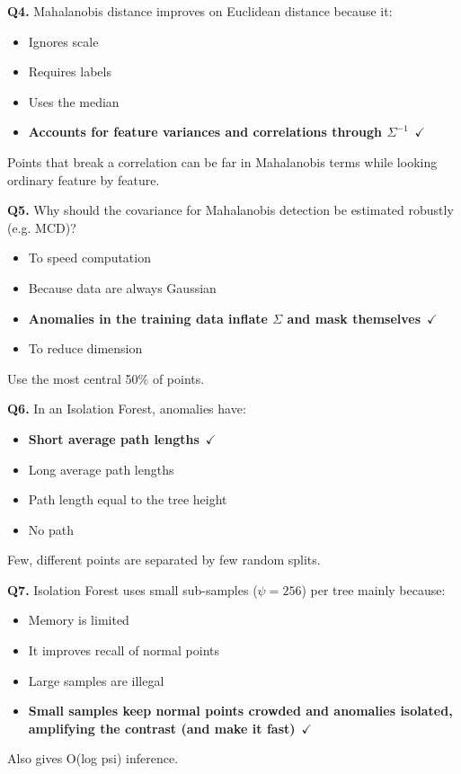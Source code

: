 \documentclass[11pt]{article}
\begin{document}
{\noindent\textbf{Q4.} Mahalanobis distance improves on Euclidean distance because it:\begin{itemize}[leftmargin=2.2em,itemsep=0pt,topsep=1pt]\item[A.] Ignores scale\item[B.] Requires labels\item[C.] Uses the median\item[\textbf{D.}] \textbf{Accounts for feature variances and correlations through $\Sigma^{-1}$}~{\color{GrnN}$\checkmark$}\end{itemize} Points that break a correlation can be far in Mahalanobis terms while looking ordinary feature by feature.\par\medskip

\noindent\textbf{Q5.} Why should the covariance for Mahalanobis detection be estimated robustly (e.g. MCD)?\begin{itemize}[leftmargin=2.2em,itemsep=0pt,topsep=1pt]\item[A.] To speed computation\item[B.] Because data are always Gaussian\item[\textbf{C.}] \textbf{Anomalies in the training data inflate $\Sigma$ and mask themselves}~{\color{GrnN}$\checkmark$}\item[D.] To reduce dimension\end{itemize} Use the most central 50\% of points.\par\medskip

\noindent\textbf{Q6.} In an Isolation Forest, anomalies have:\begin{itemize}[leftmargin=2.2em,itemsep=0pt,topsep=1pt]\item[\textbf{A.}] \textbf{Short average path lengths}~{\color{GrnN}$\checkmark$}\item[B.] Long average path lengths\item[C.] Path length equal to the tree height\item[D.] No path\end{itemize} Few, different points are separated by few random splits.\par\medskip

\noindent\textbf{Q7.} Isolation Forest uses small sub-samples ($\psi=256$) per tree mainly because:\begin{itemize}[leftmargin=2.2em,itemsep=0pt,topsep=1pt]\item[A.] Memory is limited\item[B.] It improves recall of normal points\item[C.] Large samples are illegal\item[\textbf{D.}] \textbf{Small samples keep normal points crowded and anomalies isolated, amplifying the contrast (and make it fast)}~{\color{GrnN}$\checkmark$}\end{itemize} Also gives O(log psi) inference.\par\medskip

}
\end{document}
